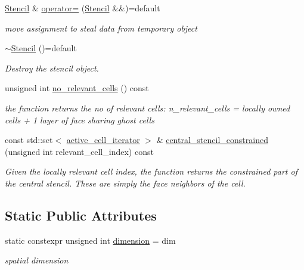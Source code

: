 \begin{DoxyCompactItemize}
\hyperlink{classweno_1_1_stencil}{Stencil} \& \hyperlink{classweno_1_1_stencil_aa336788a2665ff4dde40bf0dd853a9aa}{operator=} (\hyperlink{classweno_1_1_stencil}{Stencil} \&\&)=default
\begin{DoxyCompactList}\small\item\em move assignment to steal data from temporary object \end{DoxyCompactList}\item 
\hyperlink{classweno_1_1_stencil_adadca4d1773a270be6a84a0e9b7c7b0c}{$\sim$\+Stencil} ()=default
\begin{DoxyCompactList}\small\item\em Destroy the stencil object. \end{DoxyCompactList}\item 
unsigned int \hyperlink{classweno_1_1_stencil_a094f79cdf961bfcab7ff7af5d5faf204}{no\+\_\+relevant\+\_\+cells} () const
\begin{DoxyCompactList}\small\item\em the function returns the no of relevant cells\+: n\+\_\+relevant\+\_\+cells = locally owned cells + 1 layer of face sharing ghost cells \end{DoxyCompactList}\item 
const std\+::set$<$ \hyperlink{classweno_1_1_stencil_a5a730ad61bd5e9c36a86ccb36578f42c}{active\+\_\+cell\+\_\+iterator} $>$ \& \hyperlink{classweno_1_1_stencil_a5f739b2659593d8c83b02a01a003d6a5}{central\+\_\+stencil\+\_\+constrained} (unsigned int relevant\+\_\+cell\+\_\+index) const
\begin{DoxyCompactList}\small\item\em Given the locally relevant cell index, the function returns the constrained part of the central stencil. These are simply the face neighbors of the cell. \end{DoxyCompactList}\end{DoxyCompactItemize}
\subsection*{Static Public Attributes}
\begin{DoxyCompactItemize}
\item 
static constexpr unsigned int \hyperlink{classweno_1_1_stencil_a975242f28442f0358abc294910eb1d7b}{dimension} = dim
\begin{DoxyCompactList}\small\item\em spatial dimension \end{DoxyCompactList}\end{DoxyCompactItemize}


